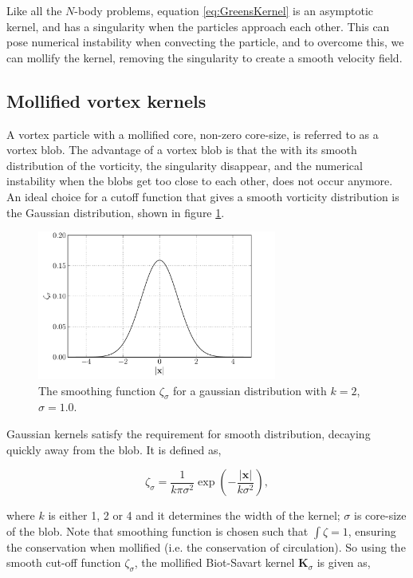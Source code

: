 Like all the $N$-body problems, equation \ref{eq:GreensKernel} is an asymptotic kernel, and has a singularity when the particles approach each other. This can pose numerical instability when convecting the particle, and to overcome this, we can mollify the kernel, removing the singularity to create a smooth velocity field.

\subsection{Mollified vortex kernels}

A vortex particle with a mollified core, non-zero core-size, is referred to as a vortex blob. The advantage of a vortex blob is that the with its smooth distribution of the vorticity, the singularity disappear, and the numerical instability when the blobs get too close to each other, does not occur anymore. An ideal choice for a cutoff function that gives a smooth vorticity distribution is the Gaussian distribution, shown in figure \ref{fig:gaussianDistribution}.

	\begin{figure}[t]
	\centering
	\includegraphics[width=0.7\textwidth]{figures/lagrangian/gaussianKernel.pdf}
	\caption{The smoothing function $\zeta_{\sigma}$ for a gaussian distribution with $k=2$, $\sigma=1.0$.}
	\label{fig:gaussianDistribution}
	\end{figure}

Gaussian kernels satisfy the requirement for smooth distribution, decaying quickly away from the blob. It is defined as,
	
	\begin{equation}
	\zeta_{\sigma} = \frac{1}{k\pi\sigma^2}\exp\left(-\frac{\left|\mathbf{x}\right|}{k\sigma^2}\right),
	\end{equation}

where $k$ is either 1, 2 or 4 and it determines the width of the kernel; $\sigma$ is core-size of the blob. Note that smoothing function is chosen such that $\int \zeta = 1$, ensuring the conservation when mollified (i.e. the conservation of circulation). So using the smooth cut-off function $\zeta_{\sigma}$, the mollified Biot-Savart kernel $\mathbf{K}_{\sigma}$ is given as,	 

